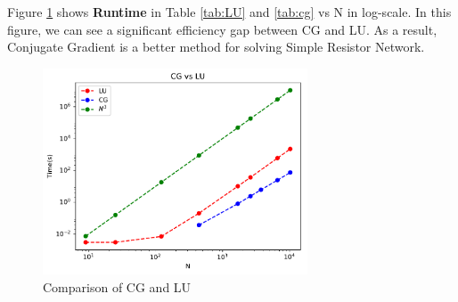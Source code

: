 \documentclass{article}
\begin{document}
Figure \ref{fig:cg vs lu} shows \textbf{Runtime} in Table \ref{tab:LU} and \ref{tab:cg} vs N in log-scale. In this figure, we can see a significant 
efficiency gap between CG and LU. As a result, Conjugate Gradient is a better method for solving Simple Resistor Network.
\begin{figure}[H]
	\centering
	\includegraphics[width=0.7\textwidth]{src/cg_vs_lu.pdf}
	\caption{Comparison of CG and LU}
	\label{fig:cg vs lu}
\end{figure}
\end{document}
